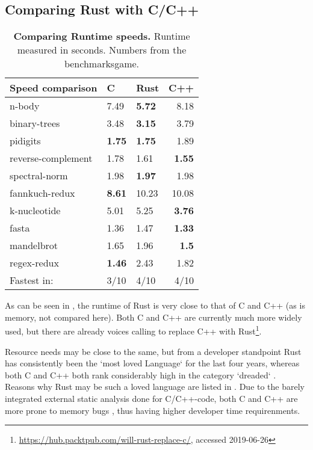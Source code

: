 \subsection{Comparing Rust with C/C++}\label{sec:rustvscc++}

\begin{table}[ht]
\begin{tabular}{@{}lllr@{}}
    \textbf{Speed comparison} & C & Rust & C++ \\ \midrule
    n-body & 7.49 & \textbf{5.72} & 8.18 \\
    binary-trees & 3.48 & \textbf{3.15} & 3.79 \\
    pidigits & \textbf{1.75} & \textbf{1.75} & 1.89 \\
    reverse-complement & 1.78 & 1.61 & \textbf{1.55} \\
    spectral-norm & 1.98 & \textbf{1.97} & 1.98 \\
    fannkuch-redux & \textbf{8.61} & 10.23 & 10.08 \\
    k-nucleotide & 5.01 & 5.25 & \textbf{3.76} \\
    fasta & 1.36 & 1.47 & \textbf{1.33} \\
    mandelbrot & 1.65 & 1.96 & \textbf{1.5} \\
    regex-redux & \textbf{1.46} & 2.43 & 1.82 \\ \midrule
    Fastest in: & 3/10 & 4/10 & 4/10 \\
\end{tabular}
    \caption[Runtime Comparison Between Rust/C/C++]{\textbf{Comparing Runtime speeds.} Runtime measured in seconds. Numbers from the benchmarksgame\footnotemark.}
    \label{tab:runtime}
\end{table}


As can be seen in , the runtime of Rust is very close to
that of C and C++ (as is memory, not compared here). Both C and C++ are
currently much more widely used, but there are already voices calling to
replace C++ with
Rust\footnote{\url{https://hub.packtpub.com/will-rust-replace-c/}, accessed
2019-06-26}.


Resource needs may be close to the same, but from a developer standpoint Rust
has consistently been the `most loved Language` \cite{rustloved} for the last
four years, whereas both C and C++ both rank considerably high in the category
`dreaded` \cite{rustloved}. Reasons why Rust may be such a loved language are
listed in . Due to the barely integrated external
static analysis done for C/C++-code, both C and C++ are more prone to memory
bugs \cite{pronememory}, thus having higher developer time requirenments.





